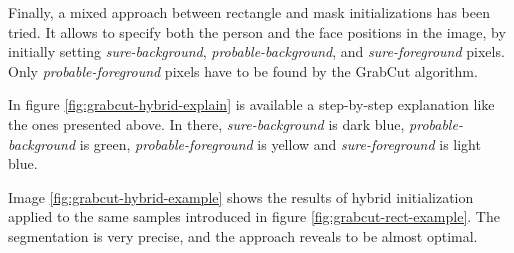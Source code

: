 Finally, a mixed approach between rectangle and mask initializations has been tried. It allows to specify both the person and the face positions in the image, by initially setting \textit{sure-background}, \textit{probable-background}, and \textit{sure-foreground} pixels. Only \textit{probable-foreground} pixels have to be found by the GrabCut algorithm. 

In figure \ref{fig:grabcut-hybrid-explain} is available a step-by-step explanation like the ones presented above. In there, \textit{sure-background} is dark blue, \textit{probable-background} is green, \textit{probable-foreground} is yellow and \textit{sure-foreground} is light blue.

Image \ref{fig:grabcut-hybrid-example} shows the results of hybrid initialization applied to the same samples introduced in figure \ref{fig:grabcut-rect-example}. The segmentation is very precise, and the approach reveals to be almost optimal.

